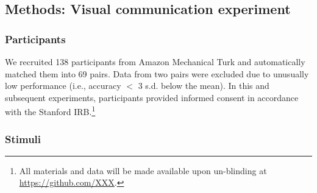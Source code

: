 \documentclass[10pt,letterpaper]{article}
\begin{document}


\subsection{Methods: Visual communication experiment}

\subsubsection{Participants} We recruited 138 participants from Amazon Mechanical Turk and automatically matched them into 69 pairs.
Data from two pairs were excluded due to unusually low performance (i.e., accuracy $<$ 3 s.d. below the mean).
In this and subsequent experiments, participants provided informed consent in accordance with the Stanford IRB.\footnote{All materials and data will be made available upon un-blinding at \url{https://github.com/XXX}.}

\subsubsection{Stimuli}
\end{document}
